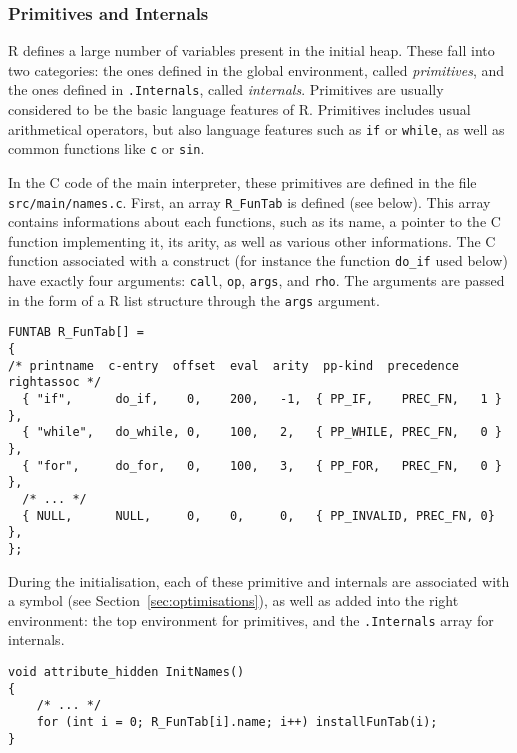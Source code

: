 \documentclass{article}
\newcommand\R{R}
\newcommand\Cn{C}
\begin{document}
\subsubsection{Primitives and Internals}
\label{sec:primitives:internals}

\R{} defines a large number of variables present in the initial heap.
These fall into two categories:
the ones defined in the global environment, called \emph{primitives},
and the ones defined in \texttt{.Internals}, called \emph{internals}.
Primitives are usually considered to be the basic language features of \R{}.
Primitives includes usual arithmetical operators,
but also language features such as \texttt{if} or \texttt{while},
as well as common functions like \texttt{c} or \texttt{sin}.

In the \Cn{} code of the main interpreter,
these primitives are defined in the file \texttt{src/main/names.c}.
First, an array \texttt{R_FunTab} is defined (see below).
This array contains informations about each functions,
such as its name, a pointer to the \Cn{} function implementing it,
its arity, as well as various other informations.
The \Cn{} function associated with a construct
(for instance the function \texttt{do_if} used below)
have exactly four arguments:
\texttt{call}, \texttt{op}, \texttt{args}, and \texttt{rho}.
The arguments are passed in the form of a \R{} list structure
through the \texttt{args} argument.
\begin{verbatim}
FUNTAB R_FunTab[] =
{
/* printname  c-entry  offset  eval  arity  pp-kind  precedence  rightassoc */
  { "if",      do_if,    0,    200,   -1,  { PP_IF,    PREC_FN,   1 } },
  { "while",   do_while, 0,    100,   2,   { PP_WHILE, PREC_FN,   0 } },
  { "for",     do_for,   0,    100,   3,   { PP_FOR,   PREC_FN,   0 } },
  /* ... */
  { NULL,      NULL,     0,    0,     0,   { PP_INVALID, PREC_FN, 0} },
};
\end{verbatim}

During the initialisation,
each of these primitive and internals are associated with a symbol
(see Section~\ref{sec:optimisations}),
as well as added into the right environment:
the top environment for primitives,
and the \texttt{.Internals} array for internals.
\begin{verbatim}
void attribute_hidden InitNames()
{
    /* ... */
    for (int i = 0; R_FunTab[i].name; i++) installFunTab(i);
}
\end{verbatim}
\end{document}

